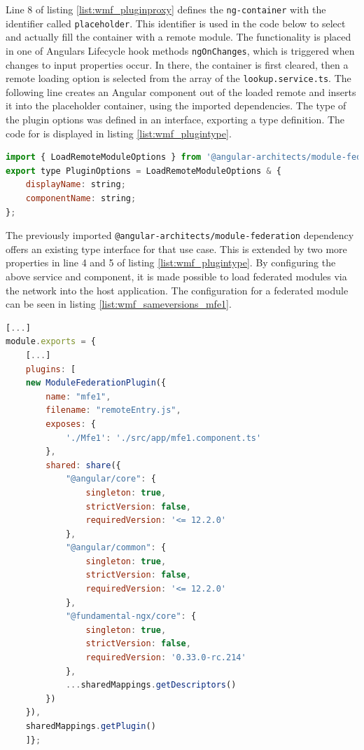 Line 8 of listing \ref{list:wmf_pluginproxy} defines the \texttt{ng-container} with the identifier called \texttt{placeholder}. This identifier is used in the code below to select and actually fill the container with a remote module. The functionality is placed in one of Angulars Lifecycle hook methods \texttt{ngOnChanges}, which is triggered when changes to input properties occur.\cite{wmf_angular_lifecyclehooks} 
In there, the container is first cleared, then a remote loading option is selected from the array of the \texttt{lookup.service.ts}. The following line creates an Angular component out of the loaded remote and inserts it into the placeholder container, using the imported dependencies.
The type of the plugin options was defined in an interface, exporting a type definition. The code for is displayed in listing \ref{list:wmf_plugintype}.
\newpage
\begin{lstlisting}[language=JavaScript, caption=Content of \texttt{plugin.ts} for remote module loading in shell applications, label=list:wmf_plugintype, xleftmargin=.05\textwidth, xrightmargin=.05\textwidth]
import { LoadRemoteModuleOptions } from '@angular-architects/module-federation';
export type PluginOptions = LoadRemoteModuleOptions & {
	displayName: string;
	componentName: string;
};
\end{lstlisting}

The previously imported \texttt{@angular-architects/module-federation} dependency offers an existing type interface for that use case. This is extended by two more properties in line 4 and 5 of listing \ref{list:wmf_plugintype}.
By configuring the above service and component, it is made possible to load federated modules via the network into the host application.
The configuration for a federated module can be seen in listing \ref{list:wmf_sameversions_mfe1}.

\begin{lstlisting}[language=JavaScript, caption=Content of \texttt{webpack.config.js} of the mfe1 remote app of the same versions WMF project, label=list:wmf_sameversions_mfe1, xleftmargin=.05\textwidth, xrightmargin=.05\textwidth]
[...]
module.exports = {
	[...]
	plugins: [
	new ModuleFederationPlugin({
		name: "mfe1",
		filename: "remoteEntry.js",
		exposes: {
			'./Mfe1': './src/app/mfe1.component.ts'
		},
		shared: share({
			"@angular/core": { 
				singleton: true, 
				strictVersion: false, 
				requiredVersion: '<= 12.2.0' 
			},
			"@angular/common": { 
				singleton: true, 
				strictVersion: false, 
				requiredVersion: '<= 12.2.0' 
			},
			"@fundamental-ngx/core": { 
				singleton: true, 
				strictVersion: false,
				requiredVersion: '0.33.0-rc.214' 
			},
			...sharedMappings.getDescriptors()
		})
	}),
	sharedMappings.getPlugin()
	]};
\end{lstlisting}


